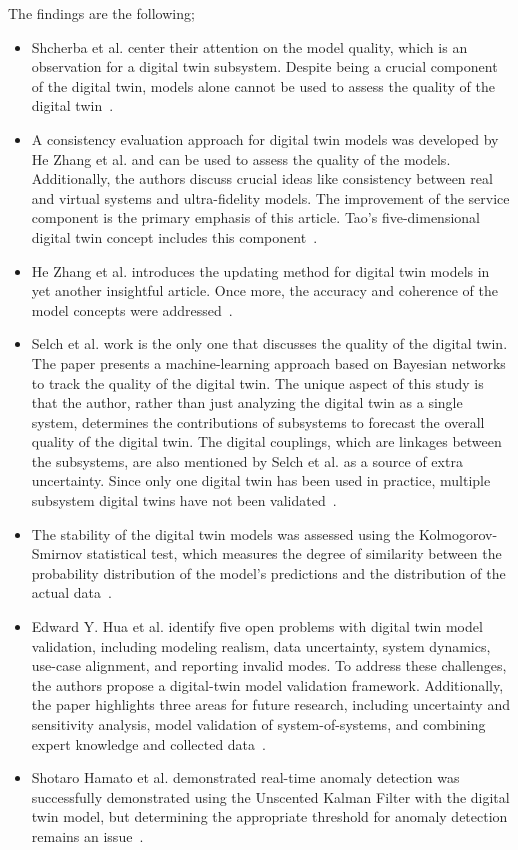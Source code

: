 \documentclass{llncs}
\begin{document}
    The findings are the following;
    \begin{itemize}
        \item Shcherba et al. center their attention on the model quality, which is an observation for a digital twin subsystem. Despite being a crucial component of the digital twin, models alone cannot be used to assess the quality of the digital twin~\cite{Shcherba}.
        \item A consistency evaluation approach for digital twin models was developed by He Zhang et al. and can be used to assess the quality of the models. Additionally, 
        the authors discuss crucial ideas like consistency between real and virtual systems and ultra-fidelity models. The improvement of the service component is the primary emphasis of this article. Tao's five-dimensional digital twin concept includes this component~\cite{ZHANGEVALUATIONMETHOD}.
        \item He Zhang et al. introduces the updating method for digital twin models in yet another insightful article. Once more, the accuracy and coherence of the model concepts were addressed~\cite{ZHANGUPDATEMETHOD}.
        \item Selch et al. work is the only one that discusses the quality of the digital twin. The paper presents a machine-learning approach based on Bayesian networks to track the quality of the digital twin. The unique aspect of this study is that the author, rather than just analyzing the digital twin as a single system, determines the contributions of subsystems to forecast the overall quality of the digital twin. The digital couplings, which are linkages between the subsystems, are also mentioned by Selch et al. as a source of extra uncertainty. 
        Since only one digital twin has been used in practice, multiple subsystem digital twins have not been validated~\cite{QualityMonitoringofCoupledDigitalTwins}.
        \item The stability of the digital twin models was assessed using the Kolmogorov-Smirnov statistical test, which measures the degree of similarity between the probability distribution of the model's predictions and the distribution of the actual data~\cite{RadarDigitalTwin}.
        \item Edward Y. Hua et al. identify five open problems with digital twin model validation, including modeling realism, data uncertainty, system dynamics, use-case alignment, and reporting invalid modes. To address these challenges, the authors propose a digital-twin model validation framework. Additionally, the paper highlights three areas for future research, 
        including uncertainty and sensitivity analysis, model validation of system-of-systems, and combining expert knowledge and collected data~\cite{ValidationofDigitalTwins}.
        \item Shotaro Hamato et al. demonstrated real-time anomaly detection was successfully demonstrated using the Unscented Kalman Filter with the digital twin model, but determining the appropriate threshold for anomaly detection remains an issue~\cite{JapeneseKalmanFilterCorrectness}.
    \end{itemize}
\end{document}
